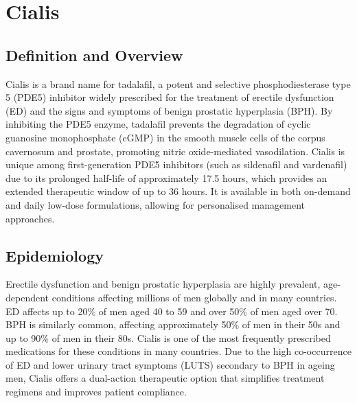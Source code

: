 \chapter{Cialis}

\section*{Definition and Overview}
Cialis is a brand name for tadalafil, a potent and selective phosphodiesterase type 5 (PDE5) inhibitor widely prescribed for the treatment of erectile dysfunction (ED) and the signs and symptoms of benign prostatic hyperplasia (BPH). By inhibiting the PDE5 enzyme, tadalafil prevents the degradation of cyclic guanosine monophosphate (cGMP) in the smooth muscle cells of the corpus cavernosum and prostate, promoting nitric oxide-mediated vasodilation. Cialis is unique among first-generation PDE5 inhibitors (such as sildenafil and vardenafil) due to its prolonged half-life of approximately 17.5 hours, which provides an extended therapeutic window of up to 36 hours. It is available in both on-demand and daily low-dose formulations, allowing for personalised management approaches.

\section*{Epidemiology}
Erectile dysfunction and benign prostatic hyperplasia are highly prevalent, age-dependent conditions affecting millions of men globally and in many countries. ED affects up to 20\% of men aged 40 to 59 and over 50\% of men aged over 70. BPH is similarly common, affecting approximately 50\% of men in their 50s and up to 90\% of men in their 80s. Cialis is one of the most frequently prescribed medications for these conditions in many countries. Due to the high co-occurrence of ED and lower urinary tract symptoms (LUTS) secondary to BPH in ageing men, Cialis offers a dual-action therapeutic option that simplifies treatment regimens and improves patient compliance.

